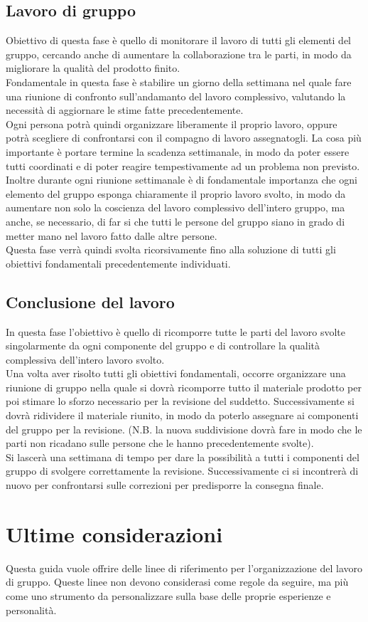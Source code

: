 \documentclass[11pt,a4paper]{article}
\begin{document}
	\subsection{Lavoro di gruppo}
	Obiettivo di questa fase è quello di monitorare il lavoro di tutti gli elementi del gruppo, cercando anche di aumentare la collaborazione tra le parti, in modo da migliorare la qualità del prodotto finito.\\
	Fondamentale in questa fase è stabilire un giorno della settimana nel quale fare una riunione di confronto sull'andamanto del lavoro complessivo, valutando la necessità di aggiornare le stime fatte precedentemente.\\
	Ogni persona potrà quindi organizzare liberamente il proprio lavoro, oppure potrà scegliere di confrontarsi con il compagno di lavoro assegnatogli. La cosa più importante è portare termine la scadenza settimanale, in modo da poter essere tutti coordinati e di poter reagire tempestivamente ad un problema non previsto.\\
	Inoltre durante ogni riunione settimanale è di fondamentale importanza che ogni elemento del gruppo esponga chiaramente il proprio lavoro svolto, in modo da aumentare non solo la coscienza del lavoro complessivo dell'intero gruppo, ma anche, se necessario, di far si che tutti le persone del gruppo siano in grado di metter mano nel lavoro fatto dalle altre persone.\\
	Questa fase verrà quindi svolta ricorsivamente fino alla soluzione di tutti gli obiettivi fondamentali precedentemente individuati.\\
	
	\subsection{Conclusione del lavoro}
	In questa fase l'obiettivo è quello di ricomporre tutte le parti del lavoro svolte singolarmente da ogni componente del gruppo e di controllare la qualità complessiva dell'intero lavoro svolto.\\
	Una volta aver risolto tutti gli obiettivi fondamentali, occorre organizzare una riunione di gruppo nella quale si dovrà ricomporre tutto il materiale prodotto per poi stimare lo sforzo necessario per la revisione del suddetto. Successivamente si dovrà ridividere il materiale riunito, in modo da poterlo assegnare ai componenti del gruppo per la revisione. (N.B. la nuova suddivisione dovrà fare in modo che le parti non ricadano sulle persone che le hanno precedentemente svolte).\\
	Si lascerà una settimana di tempo per dare la possibilità a tutti i componenti del gruppo di svolgere correttamente la revisione. Successivamente ci si incontrerà di nuovo per confrontarsi sulle correzioni per predisporre la consegna finale.\\
	
	\section{Ultime considerazioni}
	Questa guida vuole offrire delle linee di riferimento per l'organizzazione del lavoro di gruppo. Queste linee non devono considerasi come regole da seguire, ma più come uno strumento da personalizzare sulla base delle proprie esperienze e personalità. \\
	
	
\end{document}
